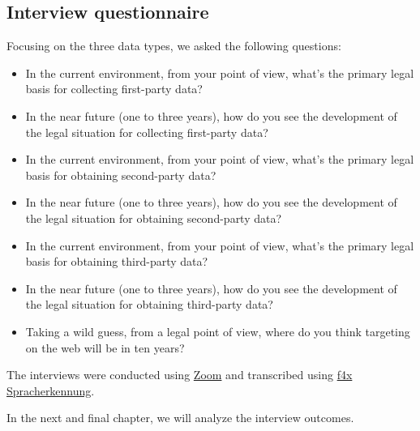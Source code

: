 \subsection{Interview questionnaire}

Focusing on the three data types, we asked the following questions:

\begin{itemize}
 \item In the current environment, from your point of view, what's the primary legal basis for collecting first-party data?
 \item In the near future (one to three years), how do you see the development of the legal situation for collecting first-party data?
 \item In the current environment, from your point of view, what's the primary legal basis for obtaining second-party data?
 \item In the near future (one to three years), how do you see the development of the legal situation for obtaining second-party data?
 \item In the current environment, from your point of view, what's the primary legal basis for obtaining third-party data?
 \item In the near future (one to three years), how do you see the development of the legal situation for obtaining third-party data?
 \item Taking a wild guess, from a legal point of view, where do you think targeting on the web will be in ten years?
\end{itemize}

The interviews were conducted using \href{https://zoom.us/}{Zoom} and transcribed using \href{https://f4x.audiotranskription.de/}{f4x Spracherkennung}.

In the next and final chapter, we will analyze the interview outcomes.

